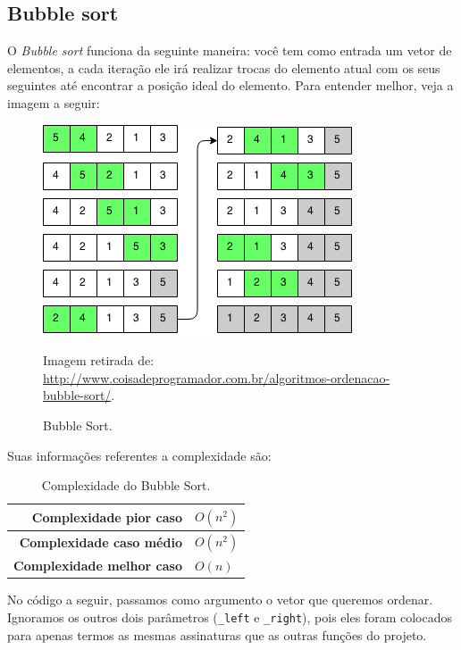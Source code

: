 

\subsection{Bubble sort}
O \textit{Bubble sort} funciona da seguinte maneira: você tem como entrada um vetor de elementos, a cada iteração ele irá realizar trocas do elemento atual com os seus seguintes até encontrar a posição ideal do elemento. Para entender melhor, veja a imagem a seguir:

\begin{figure}[H]
	\centering
	\includegraphics[scale=0.6]{img/bubble-sort.png}
	\caption{Bubble Sort.}
	\small{Imagem retirada de: \url{http://www.coisadeprogramador.com.br/algoritmos-ordenacao-bubble-sort/}.}
	\label{bubble-sort}
\end{figure}

Suas informações referentes a complexidade são:

\begin{table}[H]
 \centering
	\begin{tabular}{| r | l |}
		\hline
		\textbf{Complexidade pior caso}   & $O(n^{2})$ \\
		\hline
		\textbf{Complexidade caso médio}  & $O(n^{2})$ \\
		\hline
		\textbf{Complexidade melhor caso} & $O(n)$ \\
		\hline
	\end{tabular}
	\caption{Complexidade do Bubble Sort.}
	\label{t_bubble_sort}
\end{table}

No código a seguir, passamos como argumento o vetor que queremos ordenar. Ignoramos os outros dois parâmetros (\texttt{\_left} e \texttt{\_right}), pois eles foram colocados para apenas termos as mesmas assinaturas que as outras funções do projeto.



